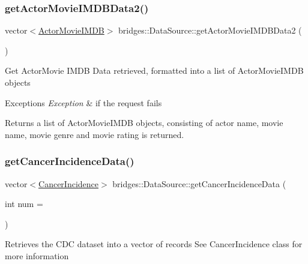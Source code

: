 \subsubsection{\texorpdfstring{get\+Actor\+Movie\+I\+M\+D\+B\+Data2()}{getActorMovieIMDBData2()}}
{\footnotesize\ttfamily vector$<$\hyperlink{classbridges_1_1dataset_1_1_actor_movie_i_m_d_b}{Actor\+Movie\+I\+M\+DB}$>$ bridges\+::\+Data\+Source\+::get\+Actor\+Movie\+I\+M\+D\+B\+Data2 (\begin{DoxyParamCaption}{ }\end{DoxyParamCaption})\hspace{0.3cm}{\ttfamily [inline]}}

Get Actor\+Movie I\+M\+DB Data retrieved, formatted into a list of Actor\+Movie\+I\+M\+DB objects


\begin{DoxyExceptions}{Exceptions}
{\em Exception} & if the request fails\\
\hline
\end{DoxyExceptions}
\begin{DoxyReturn}{Returns}
a list of Actor\+Movie\+I\+M\+DB objects, consisting of actor name, movie name, movie genre and movie rating is returned. 
\end{DoxyReturn}
\mbox{\label{classbridges_1_1_data_source_a52d8161e7c093ab3615acea7085f6689}} 
\subsubsection{\texorpdfstring{get\+Cancer\+Incidence\+Data()}{getCancerIncidenceData()}}
{\footnotesize\ttfamily vector$<$\hyperlink{classbridges_1_1dataset_1_1_cancer_incidence}{Cancer\+Incidence}$>$ bridges\+::\+Data\+Source\+::get\+Cancer\+Incidence\+Data (\begin{DoxyParamCaption}\item[{int}]{num = {} }\end{DoxyParamCaption})\hspace{0.3cm}{\ttfamily [inline]}}

Retrieves the C\+DC dataset into a vector of records See Cancer\+Incidence class for more information \mbox{\label{classbridges_1_1_data_source_aa65136879011e1ec237380ef8587fea2}} 
